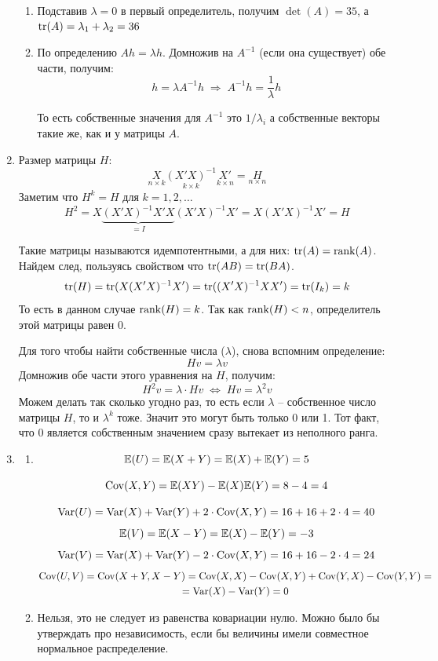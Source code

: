 \documentclass[12pt, a4paper]{article}\usepackage[]{graphicx}\usepackage[]{color}
\begin{document}
\begin{enumerate}
\begin{enumerate}
  \item Подставив $\lambda = 0$ в первый определитель, получим $\det(A)=35$, а $\operatorname{tr}(A) = \lambda_1 + \lambda_2 = 36$

  \item По определению $Ah = \lambda h$. Домножив на $A^{-1}$ (если она существует) обе части, получим:
  \[
  h = \lambda A^{-1} h \; \Rightarrow \; A^{-1}h = \frac{1}{\lambda}h
  \]



  То есть собственные значения для $A^{-1}$ это $1/\lambda_i$ а собственные векторы такие же, как и у матрицы $A$.
  \end{enumerate}



\item
  Размер матрицы $H$:
  \[
  \underset{n\times k}{X} \underset{k\times k}{(X'X)^{-1}} \underset{k\times n}{X'} = \underset{n\times n}{H}
  \]
  Заметим что $H^k = H$ для $k = 1,2,\ldots$
  \[
  H^2 = X\underbrace{(X'X)^{-1}X'X}_{{}=I}(X'X)^{-1}X' = X(X'X)^{-1}X' = H
  \]

  Такие матрицы называются идемпотентными, а для них: $\operatorname{tr}(A) = \operatorname{rank}(A)$. Найдем след, пользуясь свойством что $\operatorname{tr}(AB) = \operatorname{tr}(BA)$.
  \[
  \operatorname{tr}(H) = \operatorname{tr}(X(X'X)^{-1}X') = \operatorname{tr}((X'X)^{-1}XX') = \operatorname{tr}(I_k) = k
  \]
  То есть в данном случае $\operatorname{rank}(H) = k$. Так как $\operatorname{rank}(H) < n$, определитель этой матрицы равен 0.

  Для того чтобы найти собственные числа ($\lambda$), снова вспомним определение:
  \[
  Hv = \lambda v
  \]
  Домножив обе части этого уравнения на $H$, получим:
  \[
  H^2v = \lambda\cdot Hv \; \Leftrightarrow \; Hv = \lambda^2v
  \]
  Можем делать так сколько угодно раз, то есть если $\lambda$ -- собственное число матрицы $H$, то и $\lambda^k$ тоже. Значит это могут быть только 0 или 1. Тот факт, что 0 является собственным значением сразу вытекает из неполного ранга.



\item
  \begin{enumerate}
  \item
  \[
  \mathbb{E}(U) = \mathbb{E}(X+Y) = \mathbb{E}(X) + \mathbb{E}(Y) = 5
  \]

  \[
  \operatorname{Cov}(X,Y) = \mathbb{E}(XY) - \mathbb{E}(X)\mathbb{E}(Y) = 8 - 4 = 4
  \]

  \[
  \operatorname{Var}(U) = \operatorname{Var}(X) + \operatorname{Var}(Y) + 2\cdot \operatorname{Cov}(X, Y)= 16 + 16 + 2\cdot 4 = 40
  \]
  \[
  \mathbb{E}(V) = \mathbb{E}(X-Y) = \mathbb{E}(X) - \mathbb{E}(Y) = -3
  \]
  \[
  \operatorname{Var}(V) = \operatorname{Var}(X) + \operatorname{Var}(Y) - 2\cdot \operatorname{Cov}(X, Y)= 16 + 16 - 2\cdot 4 = 24
  \]
  \begin{multline}
  \operatorname{Cov}(U, V) = \operatorname{Cov}(X + Y, X-Y) = \operatorname{Cov}(X,X) - \operatorname{Cov}(X,Y) + \operatorname{Cov}(Y,X) - \operatorname{Cov}(Y,Y)= \\
   = \operatorname{Var}(X)-\operatorname{Var}(Y) = 0
  \end{multline}
  \item Нельзя, это не следует из равенства ковариации нулю. Можно было бы утверждать про независимость, если бы величины имели совместное нормальное распределение.


\end{enumerate}
\end{enumerate}
\end{document}
